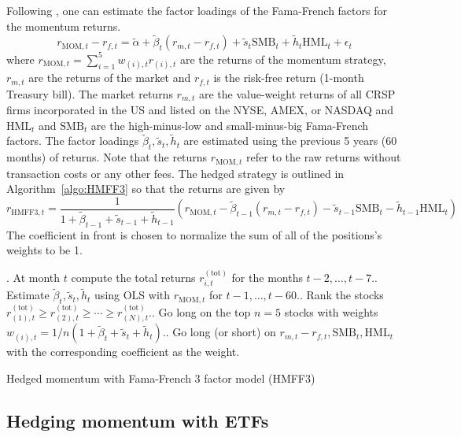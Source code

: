 \documentclass[10pt, letterpaper]{article}
\begin{document}
Following \cite{MvO}, one can estimate the factor loadings of the Fama-French factors for the momentum returns.
\[
	r_{\text{MOM},t} - r_{f,t} = \tilde{\alpha} + \tilde{\beta}_t (r_{m,t} - r_{f,t}) + \tilde{s}_t \text{SMB}_t +\tilde{h}_t \text{HML}_t + \epsilon_t
\]
where $r_{\text{MOM},t} = \sum_{i=1}^5 w_{(i),t} r_{(i), t}$ are the returns of the momentum strategy, $r_{m,t}$ are the returns of the market and $r_{f,t}$ is the risk-free return (1-month Treasury bill).  The market returns $r_{m,t}$ are the value-weight returns of all CRSP firms incorporated in the US and listed on the NYSE, AMEX, or NASDAQ and $\text{HML}_t$ and $\text{SMB}_t$ are the high-minus-low and small-minus-big Fama-French factors.  The factor loadings $\tilde{\beta}_t, \tilde{s}_t, \tilde{h}_t$ are estimated using the previous 5 years (60 months) of returns.  Note that the returns $r_{\text{MOM},t}$ refer to the raw returns without transaction costs or any other fees.  The hedged strategy is outlined in Algorithm~\ref{algo:HMFF3} so that the returns are given by
\[
	r_{\text{HMFF3}, t} = \frac{1}{1 + \tilde{\beta}_{t-1} + \tilde{s}_{t-1} + \tilde{h}_{t-1}} \left( r_{\text{MOM},t} - \tilde{\beta}_{t-1} (r_{m,t} - r_{f,t})  - \tilde{s}_{t-1} \text{SMB}_t - \tilde{h}_{t-1} \text{HML}_t   \right)
\]
The coefficient in front is chosen to normalize the sum of all of the positions's weights to be 1.

\begin{algorithm}[H]
.  At month $t$ compute the total returns $r^{(\text{tot})}_{i,t}$ for the months $t - 2,\ldots,t - 7$.. Estimate $\tilde{\beta}_t, \tilde{s}_t, \tilde{h}_t$ using OLS with $r_{\text{MOM},t}$ for $t-1,\ldots,t-60$..  Rank the stocks $r^{(\text{tot})}_{(1),t} \ge r^{(\text{tot})}_{(2),t} \ge \cdots \ge r^{(\text{tot})}_{(N),t}$..  Go long on the top $n = 5$ stocks with weights $w_{(i),t} = 1/n(1 + \tilde{\beta}_t + \tilde{s}_t + \tilde{h}_t)$.. Go long (or short) on $r_{m,t} - r_{f,t}, \text{SMB}_t, \text{HML}_t$ with the corresponding coefficient as the weight.
 \caption{Hedged momentum with Fama-French 3 factor model (HMFF3)}
 \label{algo:HMFF3}
\end{algorithm}




\subsection{Hedging momentum with ETFs}
\end{document}
